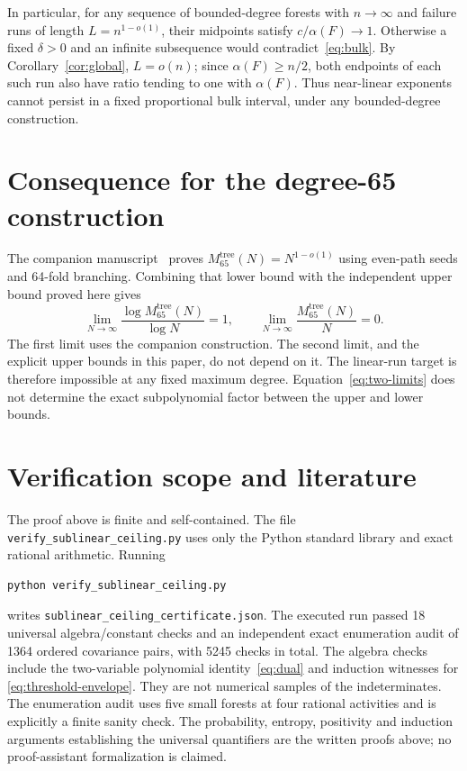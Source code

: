 \documentclass[11pt]{article}
\begin{document}
In particular, for any sequence of bounded-degree forests with
$n\to\infty$ and failure runs of length $L=n^{1-o(1)}$, their
midpoints satisfy $c/\alpha(F)\to1$. Otherwise a fixed $\delta>0$
and an infinite subsequence would contradict~\eqref{eq:bulk}.
By Corollary~\ref{cor:global}, $L=o(n)$; since $\alpha(F)\ge n/2$,
both endpoints of each such run also have ratio tending to one with
$\alpha(F)$. Thus near-linear exponents cannot persist in a fixed
proportional bulk interval, under any bounded-degree construction.

\section{Consequence for the degree-65 construction}
The companion manuscript~\cite{companion} proves
$M_{65}^{\mathrm{tree}}(N)=N^{1-o(1)}$ using even-path seeds and
64-fold branching. Combining that lower bound with the independent
upper bound proved here gives
\begin{equation}\label{eq:two-limits}
 \boxed{
 \lim_{N\to\infty}\frac{\log M_{65}^{\mathrm{tree}}(N)}{\log N}=1,
 \qquad
 \lim_{N\to\infty}\frac{M_{65}^{\mathrm{tree}}(N)}N=0.}
\end{equation}
The first limit uses the companion construction. The second limit,
and the explicit upper bounds in this paper, do not depend on it.
The linear-run target is therefore impossible at any fixed maximum
degree. Equation~\eqref{eq:two-limits} does not determine the exact
subpolynomial factor between the upper and lower bounds.

\section{Verification scope and literature}
The proof above is finite and self-contained. The file
\texttt{verify\_sublinear\_ceiling.py} uses only the Python standard
library and exact rational arithmetic. Running
\begin{verbatim}
python verify_sublinear_ceiling.py
\end{verbatim}
writes \texttt{sublinear\_ceiling\_certificate.json}. The executed run
passed 18 universal algebra/constant checks and an independent exact
enumeration audit of 1364 ordered covariance pairs, with 5245 checks
in total. The algebra checks include the two-variable polynomial
identity~\eqref{eq:dual} and induction witnesses for
\eqref{eq:threshold-envelope}. They are not numerical samples of the
indeterminates. The enumeration audit uses five small forests at four
rational activities and is explicitly a finite sanity check. The
probability, entropy, positivity and induction arguments establishing
the universal quantifiers are the written proofs above; no
proof-assistant formalization is claimed.
\end{document}
